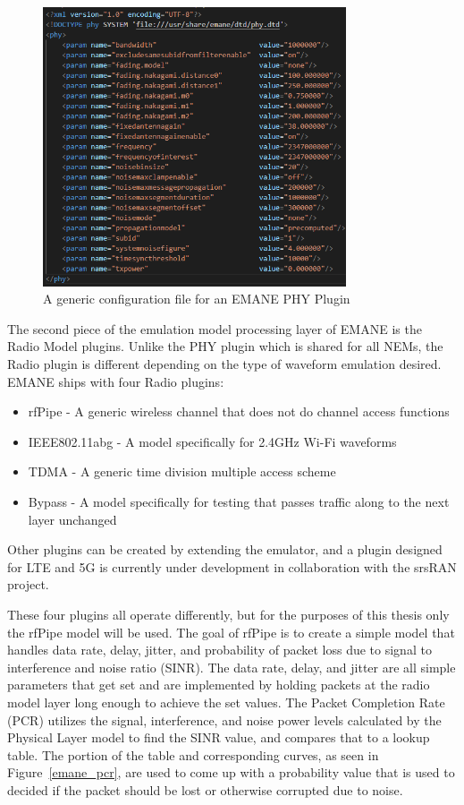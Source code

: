 \begin{figure}[!ht]
    \centering
    \includegraphics[width=0.8\textwidth,keepaspectratio]{Images/Chpt2/emane_phy.png}
    \caption{A generic configuration file for an EMANE PHY Plugin}
    \label{emane_phy}
\end{figure}

The second piece of the emulation model processing layer of EMANE is the Radio Model plugins.
Unlike the PHY plugin which is shared for all NEMs, the Radio plugin is different depending on the type of waveform emulation desired.
EMANE ships with four Radio plugins:
\begin{itemize}
    \item rfPipe - A generic wireless channel that does not do channel access functions
    \item IEEE802.11abg - A model specifically for 2.4GHz Wi-Fi waveforms
    \item TDMA - A generic time division multiple access scheme
    \item Bypass - A model specifically for testing that passes traffic along to the next layer unchanged
\end{itemize}
Other plugins can be created by extending the emulator, and a plugin designed for LTE and 5G is currently under development in collaboration with the srsRAN project.\par
These four plugins all operate differently, but for the purposes of this thesis only the rfPipe model will be used.
The goal of rfPipe is to create a simple model that handles data rate, delay, jitter, and probability of packet loss due to signal to interference and noise ratio (SINR).
The data rate, delay, and jitter are all simple parameters that get set and are implemented by holding packets at the radio model layer long enough to achieve the set values.
The Packet Completion Rate (PCR) utilizes the signal, interference, and noise power levels calculated by the Physical Layer model to find the SINR value, and compares that to a lookup table.
The portion of the table and corresponding curves, as seen in Figure~\ref{emane_pcr}, are used to come up with a probability value that is used to decided if the packet should be lost or otherwise corrupted due to noise.

